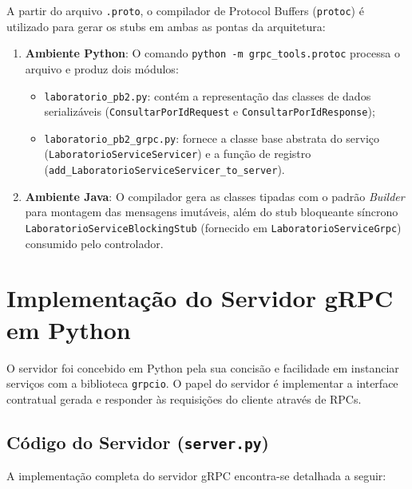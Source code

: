 \documentclass[12pt,a4paper]{article}
\begin{document}
A partir do arquivo \texttt{.proto}, o compilador de Protocol Buffers (\texttt{protoc}) é utilizado para gerar os stubs em ambas as pontas da arquitetura:

\begin{enumerate}
    \item \textbf{Ambiente Python}: O comando \texttt{python -m grpc\_tools.protoc} processa o arquivo e produz dois módulos:
    \begin{itemize}
        \item \texttt{laboratorio\_pb2.py}: contém a representação das classes de dados serializáveis (\texttt{ConsultarPorIdRequest} e \texttt{ConsultarPorIdResponse});
        \item \texttt{laboratorio\_pb2\_grpc.py}: fornece a classe base abstrata do serviço (\texttt{LaboratorioServiceServicer}) e a função de registro (\texttt{add\_Laboratorio}\allowbreak\texttt{ServiceServicer}\allowbreak\texttt{\_to\_server}).
    \end{itemize}
    \item \textbf{Ambiente Java}: O compilador gera as classes tipadas com o padrão \textit{Builder} para montagem das mensagens imutáveis, além do stub bloqueante síncrono \texttt{LaboratorioService}\allowbreak\texttt{BlockingStub} (fornecido em \texttt{LaboratorioServiceGrpc}) consumido pelo controlador.
\end{enumerate}

\section{Implementação do Servidor gRPC em Python}

O servidor foi concebido em Python pela sua concisão e facilidade em instanciar serviços com a biblioteca \texttt{grpcio}. O papel do servidor é implementar a interface contratual gerada e responder às requisições do cliente através de RPCs.

\subsection{Código do Servidor (\texttt{server.py})}

A implementação completa do servidor gRPC encontra-se detalhada a seguir:
\end{document}
